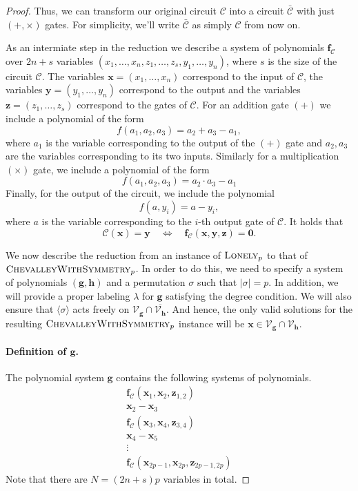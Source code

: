 \documentclass[10pt,a4paper]{article}
\theoremstyle{definition}
\theoremstyle{remark}
\def\a#1{\langle#1\rangle}
\newcommand{\calC}{\mathcal{C}}
\newcommand{\calV}{\mathcal{V}}
\newcommand{\vecf}{\ensuremath{\boldsymbol{f}}}
\newcommand{\vecg}{\ensuremath{\boldsymbol{g}}}
\newcommand{\vech}{\ensuremath{\boldsymbol{h}}}
\newcommand{\vecx}{\ensuremath{\boldsymbol{x}}}
\newcommand{\vecy}{\ensuremath{\boldsymbol{y}}}
\newcommand{\vecz}{\ensuremath{\boldsymbol{z}}}
\newcommand{\lonely}{\ensuremath\textsc{Lonely}}
\newcommand{\cChevalley}{\textsc{ChevalleyWithSymmetry}}
\begin{document}
\begin{proof}
        Thus, we can transform our original circuit $\calC$ into a circuit $\bar{\calC}$ with just $(+,\times)$ gates. For simplicity, we'll write $\bar{\calC}$ as simply $\calC$ from now on.\medskip

        As an intermiate step in the reduction we describe a system of
        polynomials $\vecf_{{\calC}}$ over $2n+s$ variables
        $(x_1, \dots, x_n, z_1, \dots, z_s, y_{1}, \dots, y_{n})$, where $s$ is the size
        of the circuit $\calC$. The variables
        $\vecx = (x_1, \dots,x_n)$ correspond to the input of $\calC$, the
        variables $\vecy = (y_1, \dots, y_n)$ correspond to the output and the variables
        $\vecz = (z_1, \dots, z_s)$  correspond to the gates of $\calC$. For an addition
        gate $(+)$ we include a polynomial of the form
        \[           f(a_1, a_2, a_3) =  a_2 + a_3 - a_1, \]
        where $a_1$ is the variable corresponding to the output of the $(+)$ gate and $a_2,a_3$
        are the variables corresponding to its two inputs. Similarly for a multiplication
        $(\times)$ gate, we include a polynomial of the form
        \[           f(a_1,a_2,a_3) = a_2 \cdot a_3 -  a_1 \]
        Finally, for the output of the circuit, we include the polynomial
        \[              f(a,y_i) =  a -  y_i, \]
        where $a$ is the variable corresponding to the $i$-th output gate of
        $\calC$.
        It holds that
        \[  \calC(\vecx) = \vecy \quad \Longleftrightarrow \quad
         \vecf_{\calC}(\vecx,\vecy,\vecz) = \boldsymbol{0}.\]

		\noindent We now describe the reduction from an instance of $\lonely_p$ to that of $\cChevalley_p$. In order to do this, we need to specify a system of polynomials $(\vecg, \vech)$ and a permutation $\sigma$ such that $|\sigma| = p$. In addition, we will provide a proper labeling $\lambda$ for $\vecg$ satisfying the degree condition. We will also ensure that $\a{\sigma}$ acts freely on $\calV_{\vecg} \cap \overline{\calV_{\vech}}$. And hence, the only valid solutions for the resulting $\cChevalley_p$ instance will be $\vecx \in \calV_{\vecg} \cap \calV_{\vech}$.

        \paragraph{Definition of $\vecg$.} The polynomial system $\vecg$ contains the
              following systems of polynomials.
             \[
              \begin{array}{c}
                   \vecf_{\calC}(\vecx_1, \vecx_2, \vecz_{1,2})\\
                   \vecx_2 - \vecx_3 \\
                   \vecf_{\calC}(\vecx_3, \vecx_4, \vecz_{3,4})\\
                   \vecx_4 - \vecx_5 \\
                   \vdots \\
                   \vecf_{\calC}(\vecx_{2p-1}, \vecx_{2p}, \vecz_{2p-1,2p})
              \end{array}
              \]
              Note that there are $N = (2n+s)p$ variables in total.



\end{proof}
\end{document}
